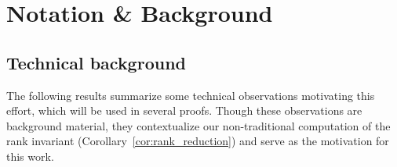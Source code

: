 \documentclass[10pt]{article}
\numberwithin{equation}{section}
\newcommand{\+}{%
	\raisebox{0.18ex}{\scaleobj{0.55}{+}}
}
\theoremstyle{definition}
\theoremstyle{definition}
\begin{document}
\section{Notation \& Background}\label{sec:background_notation}


\subsection{Technical background}\label{sec:betti_derivation}

The following results summarize some technical observations motivating this effort, which will be used in several proofs. Though these observations are background material, they contextualize our non-traditional computation of the rank invariant (Corollary~\ref{cor:rank_reduction}) and serve as the motivation for this work.  
\end{document}

